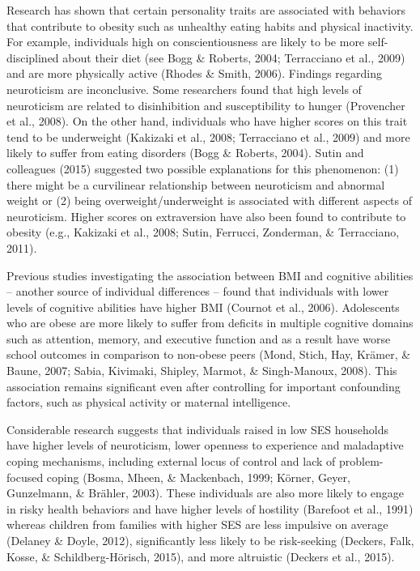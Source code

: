 \documentclass[man]{apa6}
\begin{document}
Research has shown that certain personality traits are associated with behaviors that contribute to obesity such as unhealthy eating habits and physical inactivity. For example, individuals high on conscientiousness are likely to be more self-disciplined about their diet (see Bogg \& Roberts, 2004; Terracciano et al., 2009) and are more physically active (Rhodes \& Smith, 2006). Findings regarding neuroticism are inconclusive. Some researchers found that high levels of neuroticism are related to disinhibition and susceptibility to hunger (Provencher et al., 2008). On the other hand, individuals who have higher scores on this trait tend to be underweight (Kakizaki et al., 2008; Terracciano et al., 2009) and more likely to suffer from eating disorders (Bogg \& Roberts, 2004). Sutin and colleagues (2015) suggested two possible explanations for this phenomenon: (1) there might be a curvilinear relationship between neuroticism and abnormal weight or (2) being overweight/underweight is associated with different aspects of neuroticism. Higher scores on extraversion have also been found to contribute to obesity (e.g., Kakizaki et al., 2008; Sutin, Ferrucci, Zonderman, \& Terracciano, 2011).

Previous studies investigating the association between BMI and cognitive abilities -- another source of individual differences -- found that individuals with lower levels of cognitive abilities have higher BMI (Cournot et al., 2006). Adolescents who are obese are more likely to suffer from deficits in multiple cognitive domains such as attention, memory, and executive function and as a result have worse school outcomes in comparison to non-obese peers (Mond, Stich, Hay, Krämer, \& Baune, 2007; Sabia, Kivimaki, Shipley, Marmot, \& Singh-Manoux, 2008). This association remains significant even after controlling for important confounding factors, such as physical activity or maternal intelligence.

Considerable research suggests that individuals raised in low SES households have higher levels of neuroticism, lower openness to experience and maladaptive coping mechanisms, including external locus of control and lack of problem-focused coping (Bosma, Mheen, \& Mackenbach, 1999; Körner, Geyer, Gunzelmann, \& Brähler, 2003). These individuals are also more likely to engage in risky health behaviors and have higher levels of hostility (Barefoot et al., 1991) whereas children from families with higher SES are less impulsive on average (Delaney \& Doyle, 2012), significantly less likely to be risk-seeking (Deckers, Falk, Kosse, \& Schildberg-Hörisch, 2015), and more altruistic (Deckers et al., 2015).
\end{document}
